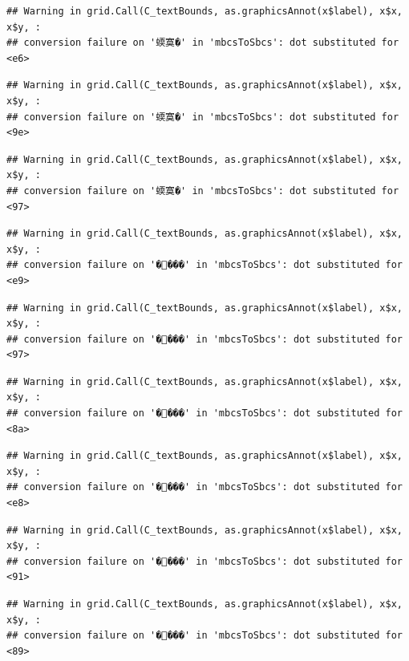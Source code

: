 \documentclass[
]{article}
\begin{document}
\begin{verbatim}
## Warning in grid.Call(C_textBounds, as.graphicsAnnot(x$label), x$x, x$y, :
## conversion failure on '蝡寞�' in 'mbcsToSbcs': dot substituted for <e6>
\end{verbatim}

\begin{verbatim}
## Warning in grid.Call(C_textBounds, as.graphicsAnnot(x$label), x$x, x$y, :
## conversion failure on '蝡寞�' in 'mbcsToSbcs': dot substituted for <9e>
\end{verbatim}

\begin{verbatim}
## Warning in grid.Call(C_textBounds, as.graphicsAnnot(x$label), x$x, x$y, :
## conversion failure on '蝡寞�' in 'mbcsToSbcs': dot substituted for <97>
\end{verbatim}

\begin{verbatim}
## Warning in grid.Call(C_textBounds, as.graphicsAnnot(x$label), x$x, x$y, :
## conversion failure on '����' in 'mbcsToSbcs': dot substituted for <e9>
\end{verbatim}

\begin{verbatim}
## Warning in grid.Call(C_textBounds, as.graphicsAnnot(x$label), x$x, x$y, :
## conversion failure on '����' in 'mbcsToSbcs': dot substituted for <97>
\end{verbatim}

\begin{verbatim}
## Warning in grid.Call(C_textBounds, as.graphicsAnnot(x$label), x$x, x$y, :
## conversion failure on '����' in 'mbcsToSbcs': dot substituted for <8a>
\end{verbatim}

\begin{verbatim}
## Warning in grid.Call(C_textBounds, as.graphicsAnnot(x$label), x$x, x$y, :
## conversion failure on '����' in 'mbcsToSbcs': dot substituted for <e8>
\end{verbatim}

\begin{verbatim}
## Warning in grid.Call(C_textBounds, as.graphicsAnnot(x$label), x$x, x$y, :
## conversion failure on '����' in 'mbcsToSbcs': dot substituted for <91>
\end{verbatim}

\begin{verbatim}
## Warning in grid.Call(C_textBounds, as.graphicsAnnot(x$label), x$x, x$y, :
## conversion failure on '����' in 'mbcsToSbcs': dot substituted for <89>
\end{verbatim}
\end{document}
